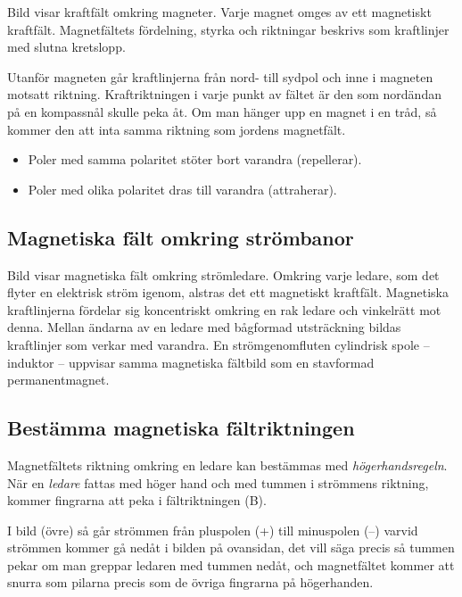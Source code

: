 Bild  visar kraftfält omkring magneter.
Varje magnet omges av ett magnetiskt kraftfält.
Magnetfältets fördelning, styrka och riktningar beskrivs som kraftlinjer med
slutna kretslopp.

Utanför magneten går kraftlinjerna från nord- till sydpol och inne i magneten
motsatt riktning.
Kraftriktningen i varje punkt av fältet är den som nordändan på en kompassnål
skulle peka åt.
Om man hänger upp en magnet i en tråd, så kommer den att inta samma riktning
som jordens magnetfält.

\begin{itemize}
	\item Poler med samma polaritet stöter bort varandra (repellerar).
	\item Poler med olika polaritet dras till varandra (attraherar).
\end{itemize}

\newpage
{}

\subsection{Magnetiska fält omkring strömbanor}
\label{magfält_ström}

Bild  visar magnetiska fält omkring strömledare.
Omkring varje ledare, som det flyter en elektrisk ström igenom, alstras det ett
magnetiskt kraftfält.
Magnetiska kraftlinjerna fördelar sig koncentriskt omkring en rak ledare och
vinkelrätt mot denna.
Mellan ändarna av en ledare med bågformad utsträckning bildas kraftlinjer som
verkar med varandra.
En strömgenomfluten cylindrisk spole -- induktor -- uppvisar samma magnetiska
fältbild som en stavformad permanentmagnet.

\subsection{Bestämma magnetiska fältriktningen}

Magnetfältets riktning omkring en ledare kan bestämmas med
\emph{högerhandsregeln}.
När en \emph{ledare} fattas med höger hand och med tummen i strömmens
riktning, kommer fingrarna att peka i fältriktningen (B).

I bild  (övre) så går strömmen från pluspolen (+) till
minuspolen (--) varvid strömmen kommer gå nedåt i bilden på ovansidan,
det vill säga precis så tummen pekar om man greppar ledaren med tummen nedåt,
och magnetfältet kommer att snurra som pilarna precis som de övriga fingrarna
på högerhanden.

